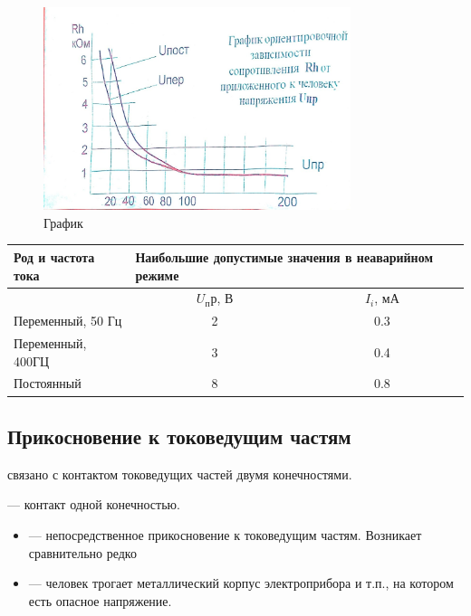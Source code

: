 \documentclass[a4paper, 14pt]{extarticle}
\begin{document}
\begin{figure}[h]
    \centering
    \includegraphics[width=0.8\textwidth]{./img/L2/S001fig.jpg}
    \caption{График}%
    \label{img:l2:1}
\end{figure}

\begin{table}[h]
\centering
\begin{tabular}{@{}lcc@{}}
\toprule
Род и частота тока & \multicolumn{2}{l}{Наибольшие допустимые значения в неаварийном режиме} \\ \midrule
                   & $U_пр$, В                          & $I_i$, мА                          \\ \midrule
Переменный, 50 Гц  & 2                                  & 0.3                                \\
Переменный, 400ГЦ  & 3                                  & 0.4                                \\
Постоянный         & 8                                  & 0.8                                \\ \bottomrule
\end{tabular}
\end{table}

\FloatBarrier{}
\subsection{Прикосновение к токоведущим частям}
 связано с контактом токоведущих частей двумя конечностями.

 --- контакт одной конечностью.

\begin{itemize}
    \item {} --- непосредственное прикосновение к токоведущим частям. Возникает сравнительно редко
    \item {} --- человек трогает металлический корпус электроприбора и т.п., на котором есть опасное напряжение. 
\end{itemize}
\end{document}
